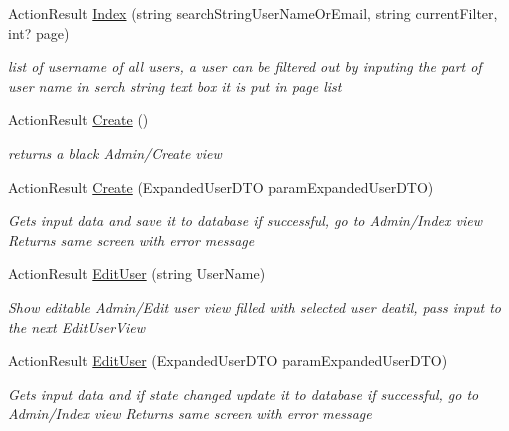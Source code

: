 \begin{DoxyCompactItemize}
\item 
Action\+Result \hyperlink{class_alfa_accounting_1_1_controllers_1_1_admin_controller_ad5443e8c6d9c2b3777f9fba513e3a671}{Index} (string search\+String\+User\+Name\+Or\+Email, string current\+Filter, int? page)
\begin{DoxyCompactList}\small\item\em list of username of all users, a user can be filtered out by inputing the part of user name in serch string text box it is put in page list \end{DoxyCompactList}\item 
Action\+Result \hyperlink{class_alfa_accounting_1_1_controllers_1_1_admin_controller_a47eec1c8309957dd23123d70b40cb9a8}{Create} ()
\begin{DoxyCompactList}\small\item\em returns a black Admin/\+Create view \end{DoxyCompactList}\item 
Action\+Result \hyperlink{class_alfa_accounting_1_1_controllers_1_1_admin_controller_a9b10157b4c6ffb1a37d8871e5c3d5df1}{Create} (Expanded\+User\+D\+TO param\+Expanded\+User\+D\+TO)
\begin{DoxyCompactList}\small\item\em Gets input data and save it to database if successful, go to Admin/\+Index view Returns same screen with error message \end{DoxyCompactList}\item 
Action\+Result \hyperlink{class_alfa_accounting_1_1_controllers_1_1_admin_controller_a1780b7c4be2391ed0d5cbc266851bfe8}{Edit\+User} (string User\+Name)
\begin{DoxyCompactList}\small\item\em Show editable Admin/\+Edit user view filled with selected user deatil, pass input to the next Edit\+User\+View \end{DoxyCompactList}\item 
Action\+Result \hyperlink{class_alfa_accounting_1_1_controllers_1_1_admin_controller_a4b86dd20b249b83effa34719bb32bcf3}{Edit\+User} (Expanded\+User\+D\+TO param\+Expanded\+User\+D\+TO)
\begin{DoxyCompactList}\small\item\em Gets input data and if state changed update it to database if successful, go to Admin/\+Index view Returns same screen with error message \end{DoxyCompactList}\item 

\end{DoxyCompactItemize}
